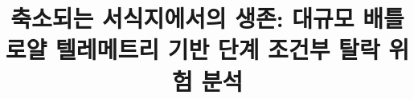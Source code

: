 \documentclass[conference]{IEEEtran}
\begin{document}
\title{축소되는 서식지에서의 생존: 대규모 배틀로얄 텔레메트리 기반 단계 조건부 탈락 위험 분석}
\author{}
\maketitle











\end{document}
